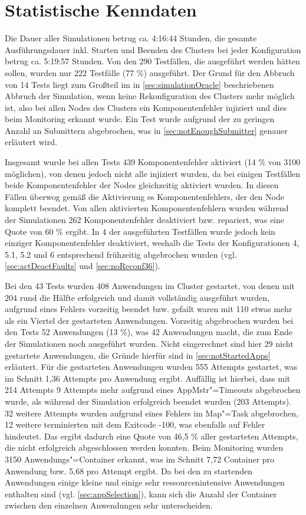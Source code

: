 \section{Statistische Kenndaten}
\label{sec:evaluationStats}

Die Dauer aller Simulationen betrug ca. 4:16:44 Stunden, die gesamte Ausführungsdauer inkl. Starten und Beenden des Clusters bei jeder Konfiguration betrug ca. 5:19:57 Stunden.
Von den 290 Testfällen, die ausgeführt werden hätten sollen, wurden nur 222 Testfälle (77 \%) ausgeführt.
Der Grund für den Abbruch von 14 Tests liegt zum Großteil im in \autoref{sec:simulationOracle} beschriebenen Abbruch der Simulation, wenn keine Rekonfiguration des Clusters mehr möglich ist, also bei allen Nodes des Clusters ein Komponentenfehler injiziert und dies beim Monitoring erkannt wurde.
Ein Test wurde aufgrund der zu geringen Anzahl an Submittern abgebrochen, was in \autoref{sec:notEnoughSubmitter} genauer erläutert wird.

Insgesamt wurde bei allen Tests 439 Komponentenfehler aktiviert (14 \% von 3100 möglichen), von denen jedoch nicht alle injiziert wurden, da bei einigen Testfällen beide Komponentenfehler der Nodes gleichzeitig aktiviert wurden.
In diesen Fällen überwog gemäß  die Aktivierung es Komponentenfehlers, der den Node komplett beendet.
Von allen aktivierten Komponentenfehlern wurden während der Simulationen 262 Komponentenfehler deaktiviert bzw. repariert, was eine Quote von 60 \% ergibt.
In 4 der ausgeführten Testfällen wurde jedoch kein einziger Komponentenfehler deaktiviert, weshalb die Tests der Konfigurationen 4, 5.1, 5.2 und 6 entsprechend frühzeitig abgebrochen wurden (vgl. \autoref{sec:actDeactFaults} und \autoref{sec:noReconf36}).

Bei den 43 Tests wurden 408 Anwendungen im Cluster gestartet, von denen mit 204 rund die Hälfte erfolgreich und damit vollständig ausgeführt wurden, aufgrund eines Fehlers vorzeitig beendet bzw. gefailt waren mit 110 etwas mehr als ein Viertel der gestarteten Anwendungen.
Vorzeitig abgebrochen wurden bei den Tests 52 Anwendungen (13 \%), was 42 Anwendungen macht, die zum Ende der Simulationen noch ausgeführt wurden.
Nicht eingerechnet sind hier 29 nicht gestartete Anwendungen, die Gründe hierfür sind in \autoref{sec:notStartedApps} erläutert.
Für die gestarteten Anwendungen wurden 555 Attempts gestartet, was im Schnitt 1,36 Attempts pro Anwendung ergibt.
Auffällig ist hierbei, dass mit 214 Attempts 9 Attempts mehr aufgrund eines \ac{AppMstr}"=Timeouts abgebrochen wurde, als während der Simulation erfolgreich beendet wurden (203 Attempts).
32 weitere Attempts wurden aufgrund eines Fehlers im Map"=Task abgebrochen, 12 weitere terminierten mit dem Exitcode -100, was ebenfalls auf Fehler hindeutet.
Das ergibt dadurch eine Quote von 46,5 \% aller gestarteten Attempts, die nicht erfolgreich abgeschlossen werden konnten.
Beim Monitoring wurden 3150 Anwendungs"=Container erkannt, was im Schnitt 7,72 Container pro Anwendung bzw. 5,68 pro Attempt ergibt.
Da bei den zu startenden Anwendungen einige kleine und einige sehr ressourcenintensive Anwendungen enthalten sind (vgl. \autoref{sec:appSelection}), kann sich die Anzahl der Container zwischen den einzelnen Anwendungen sehr unterscheiden.

